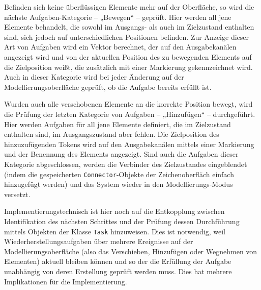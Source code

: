 Befinden sich keine überflüssigen Elemente mehr auf der Oberfläche, so wird die nächste Aufgaben-Kategorie -- „Bewegen“ -- geprüft. Hier werden all jene Elemente behandelt, die sowohl im Ausgangs- als auch im Zielzustand enthalten sind, sich jedoch auf unterschiedlichen Positionen befinden. Zur Anzeige dieser Art von Aufgaben wird ein Vektor berechnet, der auf den Ausgabekanälen angezeigt wird und von der aktuellen Position des zu bewegenden Elements auf die Zielposition weißt, die zusätzlich mit einer Markierung gekennzeichnet wird. Auch in dieser Kategorie wird bei jeder Änderung auf der Modellierungsoberfläche geprüft, ob die Aufgabe bereits erfüllt ist.

Wurden auch alle verschobenen Elemente an die korrekte Position bewegt, wird die Prüfung der letzten Kategorie von Aufgaben -- „Hinzufügen“ -- durchgeführt. Hier werden Aufgaben für all jene Elemente definiert, die im Zielzustand enthalten sind, im Ausgangszustand aber fehlen. Die Zielposition des hinzuzufügenden Tokens wird auf den Ausgabekanälen mittels einer Markierung und der Benennung des Elements angezeigt. Sind auch die Aufgaben dieser Kategorie abgeschlossen, werden die Verbinder des Zielzustandes eingeblendet (indem die gespeicherten \texttt{Connector}-Objekte der Zeichenoberfläch einfach hinzugefügt werden) und das System wieder in den Modellierungs-Modus versetzt.

Implementierungstechnisch ist hier noch auf die Entkopplung zwischen Identifikation des nächsten Schrittes und der Prüfung dessen Durchführung mittels Objekten der Klasse \texttt{Task} hinzuweisen. Dies ist notwendig, weil Wiederherstellungsaufgaben über mehrere Ereignisse auf der Modellierungsoberfläche (also das Verschieben, Hinzufügen oder Wegnehmen von Elementen) aktuell bleiben können und so der die Erfüllung der Aufgabe unabhängig von deren Erstellung geprüft werden muss. Dies hat mehrere Implikationen für die Implementierung. 

